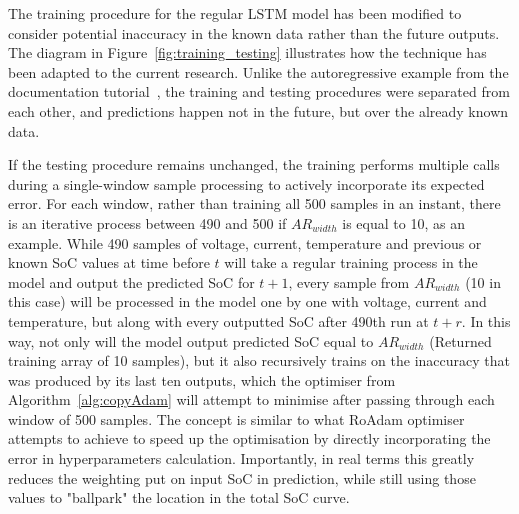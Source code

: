 %
%
{The} training procedure for the regular LSTM model has been modified to consider potential inaccuracy in the known data rather than the future outputs.
The diagram in Figure~\ref{fig:training_testing} illustrates how the technique has been adapted to the current research.
{Unlike the autoregressive example from the documentation tutorial~\cite{time_2020}, the training and testing procedures were separated from each other, and predictions happen not in the future, but over the already known data.}

%
If the testing procedure remains unchanged, the training performs multiple calls during a single-window sample processing to actively incorporate its expected error.
For each window, rather than training all 500 samples in an instant, there is an iterative process between 490 and 500 if $AR_{width}$ is equal to 10, as an example.
While 490 samples of voltage, current, temperature and previous or known SoC values at time before $t$ will take a regular training process in the model and output the predicted SoC for $t+1$, every sample from $AR_{width}$ (10 in this case) will be processed in the model one by one with voltage, current and temperature, but along with every outputted SoC after 490th run at $t+r$.
{In this way, not only will the model output predicted SoC equal to $AR_{width}$ (Returned training array of 10 samples), but it also recursively trains on the inaccuracy that was produced by its last ten outputs, which the optimiser from Algorithm~\ref{alg:copyAdam} will attempt to minimise after passing through each window of 500 samples.}
The concept is similar to what RoAdam optimiser attempts to achieve to speed up the optimisation by directly incorporating the error in hyperparameters calculation.
Importantly, in real terms this greatly reduces the weighting put on input SoC in prediction, while still using those values to "ballpark" the location in the total SoC curve.

